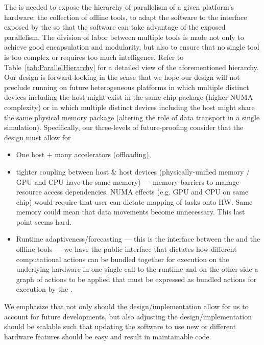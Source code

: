 \documentclass{article}
\begin{document}
The \OR is needed to expose the hierarchy of parallelism of a
given platform's hardware; the collection of offline tools, to adapt the
software to the interface exposed by the \OR so that the software can take advantage of the exposed
parallelism.  The division of labor between multiple tools is made not only to
achieve good encapsulation and modularity, but also to ensure that no single
tool is too complex or requires too much intelligence.  Refer to
Table~\ref{tab:ParallelHierarchy} for a detailed view of the aforementioned
hierarchy.\\

Our design is forward-looking in the sense that we hope our
design will not preclude running on future heterogeneous platforms in which
multiple distinct devices including the host might exist in the same chip
package (higher NUMA complexity) or in which multiple distinct devices including
the host might share the same physical memory package (altering the role of data
transport in a single simulation).  Specifically, our three-levels of
future-proofing consider that the design must allow for
\begin{itemize}
\item{One host + many accelerators (offloading),}
\item{tighter coupling between host \& host devices
(physically-unified memory / GPU and CPU have the same memory) --- memory
barriers to manage resource access dependencies.   NUMA effects (e.g. GPU and CPU
on same chip) would require that user can dictate mapping of tasks onto HW.
Same memory could mean that data movements become unnecessary.  This last point
seems hard.}
\item{Runtime adaptiveness/forecasting --- this is the interface between the
\OR and the offline tools --- we have the \OR public
interface that dictates how different computational actions can be bundled
together for execution on the underlying hardware in one single call to the
runtime and on the other side a graph of actions to be applied that
must be expressed as bundled actions for execution by the \OR.}
\end{itemize}

We emphasize that not only should the design/implementation allow for us to
account for future developments, but also adjusting the
design/implementation should be scalable such that updating the software to use
new or different hardware features should be easy and result in maintainable
code.
\end{document}
